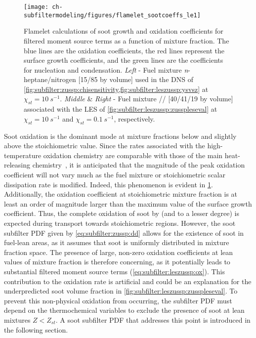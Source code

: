 \begin{figure}[htb]
  \begin{center}
    \texttt{[image: ch-subfiltermodeling/figures/flamelet\_sootcoeffs\_le1]}
    \caption[Soot Growth and Oxidation Coefficients, 1/\texorpdfstring{$\tau$}{t} vs. \texorpdfstring{$Z$}{Z}]{Flamelet calculations of soot growth and oxidation coefficients for filtered moment source terms as a function of mixture fraction. The blue lines are the oxidation coefficients, the red lines represent the surface growth coefficients, and the green lines are the coefficients for nucleation and condensation. \textit{Left} - Fuel mixture \textit{n}-heptane/nitrogen [15/85 by volume] used in the DNS of \cref{fig:subfilter:zussp:chisensitivity,fig:subfilter:leszussp:ysvsz} at $\chi_{st} = 10\ s^{-1}$. \textit{Middle} \& \textit{Right} - Fuel mixture // [40/41/19 by volume] associated with the LES of \cref{fig:subfilter:leszussp:zusspleseval} at $\chi_{st} = 10\ s^{-1}$ and $\chi_{st} = 0.1\ s^{-1}$, respectively.}
    \label{fig:subfilter:leszussp:kvsz}
  \end{center}
\end{figure}

Soot oxidation is the dominant mode at mixture fractions below and slightly above the stoichiometric value. Since the rates associated with the high-temperature oxidation chemistry are comparable with those of the main heat-releasing chemistry~\cite{guo2016}, it is anticipated that the magnitude of the peak oxidation coefficient will not vary much as the fuel mixture or stoichiometric scalar dissipation rate is modified. Indeed, this phenomenon is evident in \cref{fig:subfilter:leszussp:kvsz}. Additionally, the oxidation coefficient at stoichiometric mixture fraction is at least an order of magnitude larger than the maximum value of the surface growth coefficient. Thus, the complete oxidation of soot by  (and  to a lesser degree) is expected during transport towards stoichiometric regions. However, the soot subfilter PDF given by \cref{eq:subfilter:zussp:dd} allows for the existence of soot in fuel-lean areas, as it assumes that soot is uniformly distributed in mixture fraction space. The presence of large, non-zero oxidation coefficients at lean values of mixture fraction is therefore concerning, as it potentially leads to substantial filtered moment source terms (\cref{eq:subfilter:leszussp:ox}). This contribution to the oxidation rate is artificial and could be an explanation for the underpredicted soot volume fraction in \cref{fig:subfilter:leszussp:zusspleseval}. To prevent this non-physical oxidation from occurring, the subfilter PDF must depend on the thermochemical variables to exclude the presence of soot at lean mixtures $Z < Z_{st}$. A soot subfilter PDF that addresses this point is introduced in the following section.
